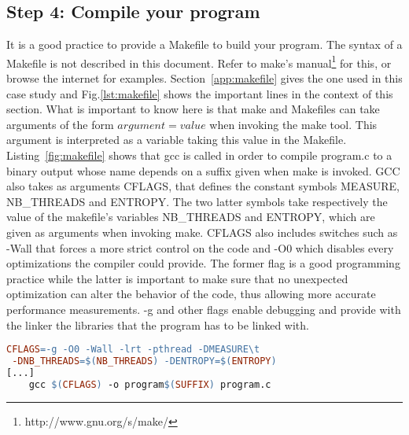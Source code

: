 \subsection{Step 4: Compile your program}
\label{sec:compile}
It is a good practice to provide a Makefile to build your program. The syntax of a Makefile is not described in this document. Refer to make's manual\footnote{http://www.gnu.org/s/make/} for this, or browse the internet for examples. Section~\ref{app:makefile} gives the one used in this case study and Fig.\ref{lst:makefile} shows the important lines in the context of this section. What is important to know here is that make and Makefiles can take arguments of the form $argument=value$ when invoking the make tool. This argument is interpreted as a variable taking this value in the Makefile. Listing~\ref{fig:makefile} shows that gcc is called in order to compile program.c to a binary output whose name depends on a suffix given when make is invoked. GCC also takes as arguments {CFLAGS}, that defines the constant symbols {MEASURE}, {NB\_THREADS} and {ENTROPY}. The two latter symbols take respectively the value of the makefile's variables {NB\_THREADS} and {ENTROPY}, which are given as arguments when invoking make. {CFLAGS} also includes switches such as {-Wall} that forces a more strict control on the code and {-O0} which disables every optimizations the compiler could provide. The former flag is a good programming practice while the latter is important to make sure that no unexpected optimization can alter the behavior of the code, thus allowing more accurate performance measurements. {-g} and other flags enable debugging and provide with the linker the libraries that the program has to be linked with.

\begin{lstlisting}[caption={GCC is invoked with options defining symbols handled by the {C} preprocessor directives (\#if, etc).},label={lst:makefile},language=make]
CFLAGS=-g -O0 -Wall -lrt -pthread -DMEASURE\t
 -DNB_THREADS=$(NB_THREADS) -DENTROPY=$(ENTROPY)
[...]
	gcc $(CFLAGS) -o program$(SUFFIX) program.c
\end{lstlisting}

